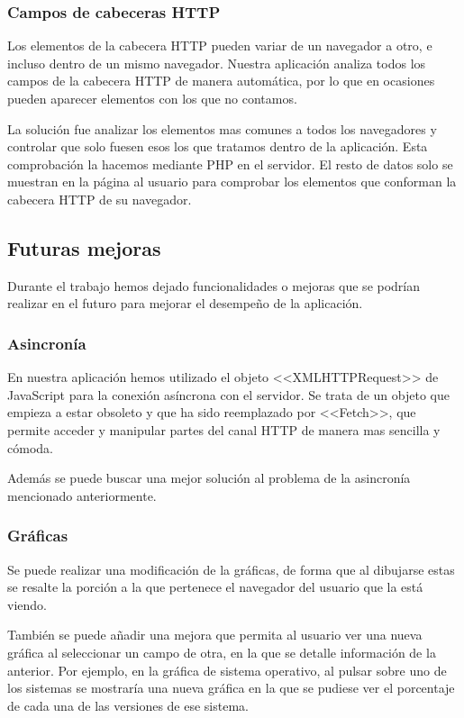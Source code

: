 \subsubsection{Campos de cabeceras HTTP}
Los elementos de la cabecera HTTP pueden variar de un navegador a otro, e incluso dentro de un mismo navegador. Nuestra aplicación analiza todos los campos de la cabecera HTTP de manera automática, por lo que en ocasiones pueden aparecer elementos con los que no contamos.\par 
La solución fue analizar los elementos mas comunes a todos los navegadores y controlar que solo fuesen esos los que tratamos dentro de la aplicación. Esta comprobación la hacemos mediante PHP en el servidor. El resto de datos solo se muestran en la página al usuario para comprobar los elementos que conforman la cabecera HTTP de su navegador.
\subsection{Futuras mejoras}
Durante el trabajo hemos dejado funcionalidades o mejoras que se podrían realizar en el futuro para mejorar el desempeño de la aplicación.
\subsubsection{Asincronía}
En nuestra aplicación hemos utilizado el objeto <<XMLHTTPRequest>> de JavaScript para la conexión asíncrona con el servidor. Se trata de un objeto que empieza a estar obsoleto y que ha sido reemplazado por <<Fetch>>, que permite acceder y manipular partes del canal HTTP de manera mas sencilla y cómoda.\par 
Además se puede buscar una mejor solución al problema de la asincronía mencionado anteriormente.
\subsubsection{Gráficas}
Se puede realizar una modificación de la gráficas, de forma que al dibujarse estas se resalte la porción a la que pertenece el navegador del usuario que la está viendo.\par 
También se puede añadir una mejora que permita al usuario ver una nueva gráfica al seleccionar un campo de otra, en la que se detalle información de la anterior. Por ejemplo, en la gráfica de sistema operativo, al pulsar sobre uno de los sistemas se mostraría una nueva gráfica en la que se pudiese ver el porcentaje de cada una de las versiones de ese sistema.
